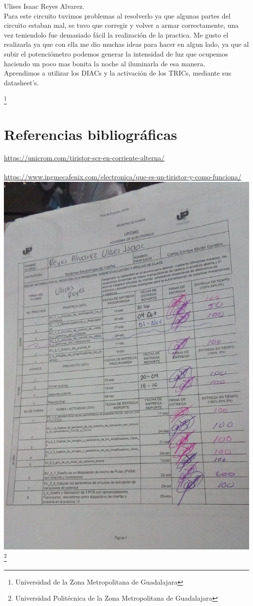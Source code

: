 \documentclass[10pt,a4paper]{article}
\begin{document}
Ulises Isaac Reyes Alvarez.\\
Para este circuito tuvimos problemas al resolverlo ya que algunas partes del circuito estaban mal, se tuvo que corregir y volver a armar correctamente, una vez teniendolo fue demasiado fácil la realización de la practica. Me gusto el realizarla ya que con ella me dio muchas ideas para hacer en algun lado, ya que al subir el potenciómetro podemos generar la intensidad de luz que ocupemos haciendo un poco mas bonita la noche al iluminarla de esa manera.\\
Aprendimos a utilizar los DIACs y la activación de los TRICs, mediante sus datasheet's.

\footnote{Universidad de la Zona Metropolitana de Guadalajara}

\newpage
\section{Referencias bibliográficas}
\url{https://unicrom.com/tiristor-scr-en-corriente-alterna/}\\\\
\url{https://www.ingmecafenix.com/electronica/que-es-un-tiristor-y-como-funciona/}\\

\includegraphics[scale=0.45]{Pictures/Firma.jpeg} 
\centering
\footnote{Universidad Politécnica de la Zona Metropolitana de Guadalajara}
\end{document}
